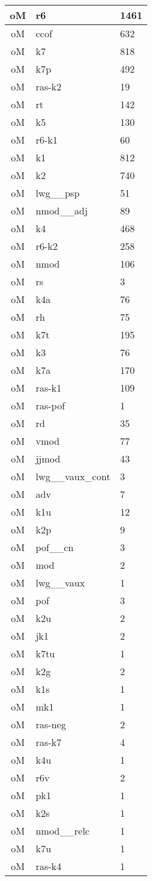 \documentclass[a4 paper]{article}
\begin{document}
\begin{longtable}{cp{}p{}}
oM & r6 & 1461\\ \midrule oM & ccof & 632\\ \midrule oM & k7 & 818\\ \midrule oM & k7p & 492\\ \midrule oM & ras-k2 & 19\\ \midrule oM & rt & 142\\ \midrule oM & k5 & 130\\ \midrule oM & r6-k1 & 60\\ \midrule oM & k1 & 812\\ \midrule oM & k2 & 740\\ \midrule oM & lwg\_\_psp & 51\\ \midrule oM & nmod\_\_adj & 89\\ \midrule oM & k4 & 468\\ \midrule oM & r6-k2 & 258\\ \midrule oM & nmod & 106\\ \midrule oM & rs & 3\\ \midrule oM & k4a & 76\\ \midrule oM & rh & 75\\ \midrule oM & k7t & 195\\ \midrule oM & k3 & 76\\ \midrule oM & k7a & 170\\ \midrule oM & ras-k1 & 109\\ \midrule oM & ras-pof & 1\\ \midrule oM & rd & 35\\ \midrule oM & vmod & 77\\ \midrule oM & jjmod & 43\\ \midrule oM & lwg\_\_vaux\_cont & 3\\ \midrule oM & adv & 7\\ \midrule oM & k1u & 12\\ \midrule oM & k2p & 9\\ \midrule oM & pof\_\_cn & 3\\ \midrule oM & mod & 2\\ \midrule oM & lwg\_\_vaux & 1\\ \midrule oM & pof & 3\\ \midrule oM & k2u & 2\\ \midrule oM & jk1 & 2\\ \midrule oM & k7tu & 1\\ \midrule oM & k2g & 2\\ \midrule oM & k1s & 1\\ \midrule oM & mk1 & 1\\ \midrule oM & ras-neg & 2\\ \midrule oM & ras-k7 & 4\\ \midrule oM & k4u & 1\\ \midrule oM & r6v & 2\\ \midrule oM & pk1 & 1\\ \midrule oM & k2s & 1\\ \midrule oM & nmod\_\_relc & 1\\ \midrule oM & k7u & 1\\ \midrule oM & ras-k4 & 1\\ \midrule 

\end{longtable}
\end{document}
